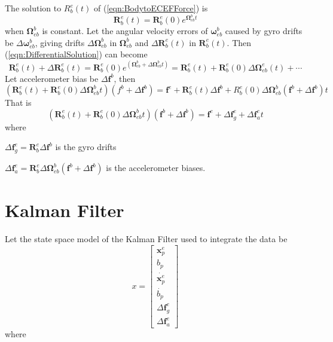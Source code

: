\documentclass[a4paper]{report}
\numberwithin{equation}{chapter}
\newcommand{\mat}[1]{\boldsymbol{#1}}
\begin{document}
The solution to $R^e_b \left( t \right)$ of (\ref{eqn:BodytoECEFForce}) is
\begin{equation}
\mat{R}^e_b \left( t \right) = \mat{R}^e_b \left( 0 \right) e^{\mat{\Omega}^b_{eb} t}
\label{eqn:DifferentialSolution}
\end{equation}
when $\mat{\Omega}^b_{eb}$ is constant. Let the angular velocity errors of $\mat{\omega}^b_{eb}$ caused by gyro drifts be $\Delta \mat{\omega}^b_{eb}$, giving drifts $\Delta \mat{\Omega}^b_{eb}$ in $\mat{\Omega}^b_{eb}$ and $\Delta \mat{R}^e_b \left( t \right)$ in $\mat{R}^e_b \left( t \right)$. Then (\ref{eqn:DifferentialSolution}) can become
\begin{equation}
\mat{R}^e_b \left( t \right) + \Delta \mat{R}^e_b \left( t \right) = \mat{R}^e_b \left( 0 \right) e^{\left( \mat{\Omega}^b_{eb} + \Delta \mat{\Omega}^b_{eb} t \right)} = \mat{R}^e_b \left( t \right) + \mat{R}^e_b \left( 0 \right) \Delta \mat{\Omega}^e_{eb} \left( t \right) + \dotsb
\end{equation}
Let accelerometer bias be $\Delta \mat{f}^b$, then
\begin{equation}
\left( \mat{R}^e_b \left( t \right) + \mat{R}^e_b \left( 0 \right) \Delta \mat{\Omega}^b_{eb} t \right) \left( f^b + \Delta \mat{f}^b \right) = \mat{f}^e + \mat{R}^e_b \left( t \right) \Delta \mat{f}^b + R^e_b \left( 0 \right) \Delta \mat{\Omega}^b_{eb} \left( \mat{f}^b + \Delta \mat{f}^b \right) t
\end{equation}
That is
\begin{equation}
\left( \mat{R}^e_b \left( t \right) + \mat{R}^e_b \left( 0 \right) \Delta \mat{\Omega}^b_{eb} t \right) \left( \mat{f}^b + \Delta \mat{f}^b \right) = \mat{f}^e + \Delta \mat{f}^e_g + \Delta \mat{f}^e_a t
\end{equation}
where

$\Delta \mat{f}^e_g = \mat{R}^e_b \Delta \mat{f}^b$ is the gyro drifts

$\Delta \mat{f}^e_a = \mat{R}^e_b \Delta \mat{\Omega}^b_{eb} \left( \mat{f}^b + \Delta \mat{f}^b \right)$ is the accelerometer biases.


\section[Kalman Filter]{Kalman Filter}

Let the state space model of the Kalman Filter used to integrate the data be
\begin{equation}
x =
\begin{bmatrix}
\mat{x}^e_p\\
b_p\\
\dot{\mat{x}^e_p}\\
\dot{b_p}\\
\Delta \mat{f}^e_g\\
\Delta \mat{f}^e_a
\end{bmatrix}
\label{StateSpaceModel}
\end{equation}
where
\end{document}
